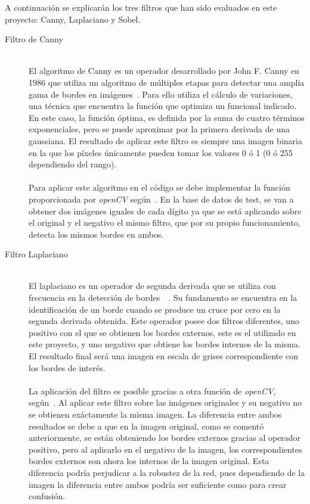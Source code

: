 A continuación se explicarán los tres filtros que han sido evaluados en este proyecto: Canny, Laplaciano y Sobel.
\vspace{10pt}
\begin{description}
	\item[Filtro de Canny] \hfill 
	\vspace{5pt}
	\\
	El algoritmo de Canny es un operador desarrollado por John F. Canny en 1986 que utiliza un algoritmo de múltiples etapas para detectar una amplia gama de bordes en imágenes~\cite{4767851}. Para ello utiliza el cálculo de variaciones, una técnica que encuentra la función que optimiza un funcional indicado. En este caso, la función óptima, es definida por la suma de cuatro términos exponenciales, pero se puede aproximar por la primera derivada de una gaussiana. El resultado de aplicar este filtro es siempre una imagen binaria en la que los píxeles únicamente pueden tomar los valores 0 ó 1 (0 ó 255 dependiendo del rango).\\
	\vspace{-10pt}
	\\
	Para aplicar este algoritmo en el código se debe implementar la función proporcionada por \textit{openCV} según~\cite{cannyOCV}. En la base de datos de test, se van a obtener dos imágenes iguales de cada dígito ya que se está aplicando sobre el original y el negativo el mismo filtro, que por su propio funcionamiento, detecta los mismos bordes en ambos.
	\vspace{20pt}
	\item[Filtro Laplaciano] \hfill 
	\vspace{5pt}
	\\
	El laplaciano es un operador de segunda derivada que se utiliza con frecuencia en la detección de bordes~\cite{laplacian}~\cite{gonzalez2008digital}. Su fundamento se encuentra en la identificación de un borde cuando se produce un cruce por cero en la segunda derivada obtenida. Este operador posee dos filtros diferentes, uno positivo con el que se obtienen los bordes externos, este es el utilizado en este proyecto, y uno negativo que obtiene los bordes internos de la misma. El resultado final será una imagen en escala de grises correspondiente con los bordes de interés.\\
	\vspace{-10pt}
	\\
	La aplicación del filtro es posible gracias a otra función de \textit{openCV}, según~\cite{laplacianOCV}. Al aplicar este filtro sobre las imágenes originales y su negativo no se obtienen exáctamente la misma imagen. La diferencia entre ambos resultados se debe a que en la imagen original, como se comentó anteriormente, se están obteniendo los bordes externos gracias al operador positivo, pero al aplicarlo en el negativo de la imagen, los correspondientes bordes externos son ahora los internos de la imagen original. Esta diferencia podría perjudicar a la robustez de la red, pues dependiendo de la imagen la diferencia entre ambos podría ser suficiente como para crear confusión.

\end{description}
